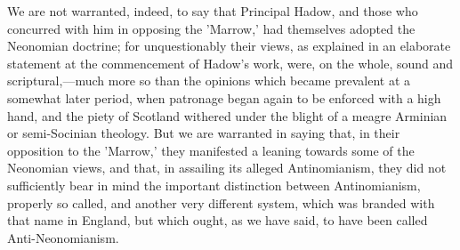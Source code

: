 \documentclass[
]{book}
\begin{document}
We are not warranted, indeed, to say that Principal Hadow, and those who concurred with him in opposing the 'Marrow,' had themselves adopted the Neonomian doctrine; for unquestionably their views, as explained in an elaborate statement at the commencement of Hadow's work, were, on the whole, sound and scriptural,---much more so than the opinions which became prevalent at a somewhat later period, when patronage began again to be enforced with a high hand, and the piety of Scotland withered under the blight of a meagre Arminian or semi-Socinian theology. But we are warranted in saying that, in their opposition to the 'Marrow,' they manifested a leaning towards some of the Neonomian views, and that, in assailing its alleged Antinomianism, they did not sufficiently bear in mind the important distinction between Antinomianism, properly so called, and another very different system, which was branded with that name in England, but which ought, as we have said, to have been called Anti-Neonomianism.
\end{document}
